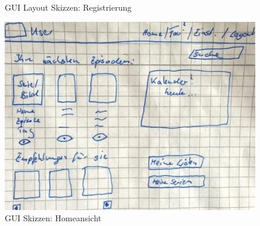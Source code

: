 \begin{figure}[h!]
\centering
\hfill
{}
\hfill %
\hfill %
\caption{GUI Layout Skizzen: Registrierung }
\label{gui-skizzen-registrierung}
\end{figure}

\vspace{0.2cm}

\begin{figure}
\centering
\includegraphics[width=.5\textwidth]{../images/dokulayout/home.jpg}
\caption{GUI Skizzen: Homeansicht}
\end{figure}

